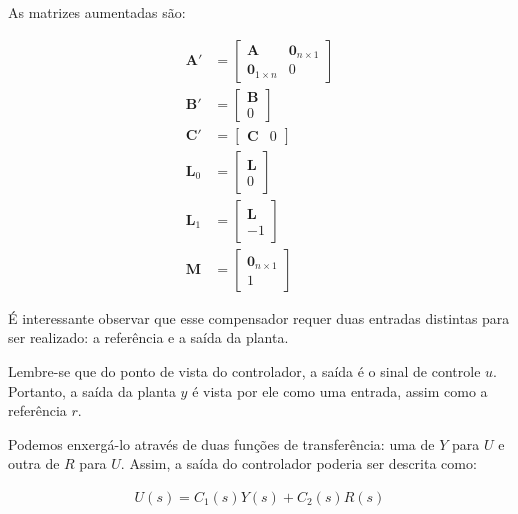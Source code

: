 \documentclass[
]{book}
\begin{document}
As matrizes aumentadas são:

\begin{align}
\mathbf{A}' &= \left[\begin{array}{ll}
                     \mathbf{A} & \mathbf{0}_{n\times 1}\\
                     \mathbf{0}_{1\times n} & 0
                \end{array}\right]\\

\mathbf{B}' &= \left[\begin{array}{cc}
\mathbf{B} \\ {0}
\end{array}\right]\\

\mathbf{C}' &= \left[\begin{array}{cc}
\mathbf{C} & {0}
\end{array}\right]\\

\mathbf{L}_0 &= \left[\begin{array}{cc}
\mathbf{L} \\ {0}
\end{array}\right]\\

\mathbf{L}_1 &= \left[\begin{array}{rr}
\mathbf{L} \\ {-1}
\end{array}\right]\\

\mathbf{M} &= \left[\begin{array}{cc}
\mathbf{0}_{n\times 1} \\ 1
\end{array}\right]
\end{align}

É interessante observar que esse compensador requer duas entradas
distintas para ser realizado: a referência e a saída da planta.

Lembre-se que do ponto de vista do controlador, a saída é o sinal de
controle \(u\). Portanto, a saída da planta \(y\) é vista por ele como uma
entrada, assim como a referência \(r\).

Podemos enxergá-lo através de duas funções de transferência: uma de \(Y\)
para \(U\) e outra de \(R\) para \(U\). Assim, a saída do controlador poderia
ser descrita como:

\begin{align}
    U(s) = C_1(s)Y(s)+C_2(s)R(s)
\end{align}
\end{document}

